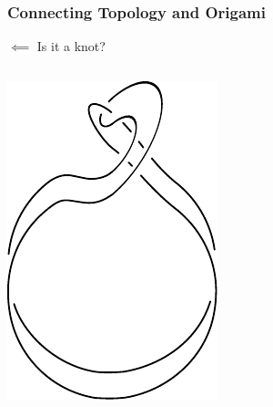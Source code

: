 \documentclass{beamer}
\begin{document}
\begin{frame}
\frametitle{Connecting Topology and Origami}
\begin{block}{$\impliedby$}
Is it a knot?
\end{block}
\begin{columns}[c]
\includegraphics[width=.9\textwidth]{knot_pix/knot_1.pdf}
\pause

\end{columns}
\end{frame}
\end{document}

